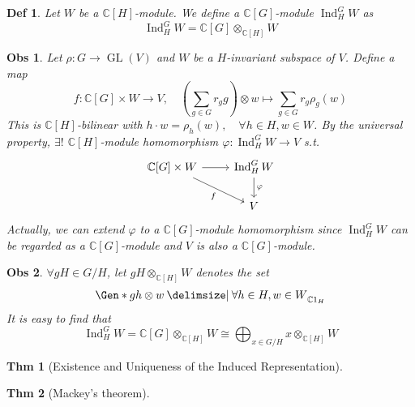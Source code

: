 \documentclass[a4paper]{article}
\newcommand*{\Cb}{\mathbb{C}}
\DeclareMathOperator{\Ind}{Ind}
\newcommand*\GL[1]{\operatorname{GL}\mathopen{}\left({#1}\right)\mathclose{}}
\providecommand\given{}
\newcommand*\SetSymbol[1][]{%
  \nonscript\:#1\vert
  \allowbreak
  \nonscript\:
\mathopen{}}
\renewcommand\given{\SetSymbol[\delimsize]}
\renewcommand\given{\SetSymbol[\delimsize]}
\theoremstyle{mystyle}
\newtheorem{theorem}{Thm}
\newtheorem{observation}{Obs}
\newtheorem{definition}{Def}
\begin{document}
\begin{definition}
  Let $W$ be a $\Cb[H]$-module. We define a $\Cb[G]$-module $\Ind^G_H W$ as
  \[
    \Ind^G_H W = \Cb[G] \otimes_{\Cb[H]} W
  \]
\end{definition}

\begin{observation}
  Let $\rho: G \to \GL{V}$ and $W$ be a $H$-invariant subspace of $V$.
  Define a map
  \[
    f: \Cb[G] \times W \to V, \quad
    \left(\sum_{g\in G} r_g g\right) \otimes w \mapsto
    \sum_{g\in G} r_g \rho_g(w)
  \]
  This is $\Cb[H]$-bilinear with $h \cdot w = \rho_h(w), \quad \forall h\in H,
  w\in W$.
  By the universal property, $\exists!$ $\Cb[H]$-module homomorphism
  $\varphi: \Ind^G_H W \to V$ s.t.
  \[
    \begin{tikzcd}
      \Cb[G] \times W \arrow[r] \arrow[dr, "f"']
      & \Ind^G_H W \arrow[d, "\varphi"] \\
      & V
    \end{tikzcd}
  \]
  Actually, we can extend $\varphi$ to a $\Cb[G]$-module homomorphism
  since $\Ind^G_H W$ can be regarded as a $\Cb[G]$-module and $V$ is also a
  $\Cb[G]$-module.
\end{observation}

\begin{observation}
  $\forall gH \in G/H$, let $gH \otimes_{\Cb[H]} W$ denotes the set
  \[
    \Gen*{ gh \otimes w \given \forall h \in H, w \in W}_{\Cb 1_H}
  \]
  It is easy to find that
  \[
    \Ind^G_H W = \Cb[G] \otimes_{\Cb[H]} W
    \cong \bigoplus_{x \in G/H} x \otimes_{\Cb[H]} W
  \]
\end{observation}

\begin{theorem}[Existence and Uniqueness of the Induced Representation]

\end{theorem}


\begin{theorem}[Mackey's theorem]
\end{theorem}

% 
% 
\end{document}
